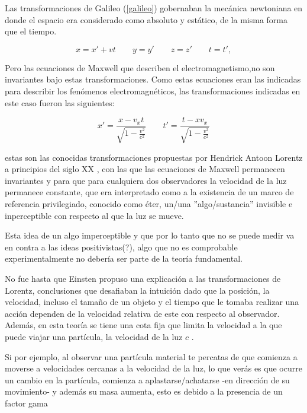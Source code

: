 \documentclass[11pt]{book}
\begin{document}
Las transformaciones de Galileo (\ref{galileo}) gobernaban la mecánica newtoniana en donde el espacio era considerado como absoluto y estático, de la misma forma que el tiempo.

\begin{equation}
 x=x'+vt \qquad y=y' \qquad z=z' \qquad t=t' ,
 \label{galileo}
\end{equation}

Pero las ecuaciones de Maxwell que describen el electromagnetismo,no son invariantes bajo estas transformaciones. Como estas ecuaciones eran las indicadas para describir los fenómenos electromagnéticos, las transformaciones indicadas en este caso fueron las siguientes:

\begin{equation}
x'=\frac{x - v_x t}{\sqrt{1-\frac{v^2}{c^2}}} \qquad t'=\frac{t-xv_x}{\sqrt{1-\frac{v^2}{c^2}}}
\label{lorentz}
\end{equation}


estas son las conocidas transformaciones propuestas por Hendrick Antoon Lorentz a principios del siglo XX %
, con las que las ecuaciones de Maxwell permanecen invariantes y para que para cualquiera dos observadores la velocidad de la luz permanece constante, que era interpretado como a la existencia de un marco de referencia privilegiado, conocido como éter, un/una ''algo/sustancia'' invisible e inperceptible con respecto al que la luz se mueve.

Esta idea de un algo imperceptible y que por lo tanto que no se puede medir va en contra a las ideas positivistas(?), algo que no es comprobable experimentalmente  no debería ser parte de la teoría fundamental.
 
No fue hasta que Einsten propuso una explicación a las transformaciones de Lorentz, conclusiones que desafiaban la intuición dado que  la posición, la velocidad, incluso el tamaño de un objeto y el tiempo que le tomaba realizar una acción dependen de la velocidad relativa de este con respecto al observador. Además, en esta teoría se tiene una cota fija que limita la velocidad a la que puede viajar una partícula, la velocidad de la luz $c$ . 

Si por ejemplo, al observar una partícula material te percatas de que comienza a moverse a velocidades cercanas a la velocidad de la luz, lo que verás es que ocurre un cambio en la partícula, comienza a aplastarse/achatarse -en dirección de su movimiento- y además su masa aumenta, esto es debido a la presencia de un factor gama 
\end{document}
